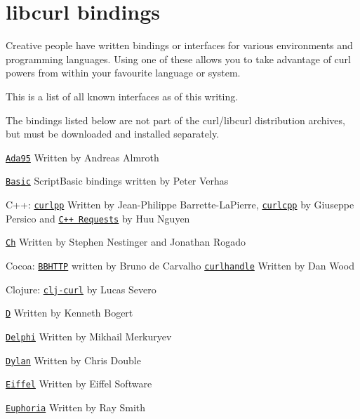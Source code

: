 \chapter{libcurl bindings }
\hypertarget{md_lib_2libwconr_2build_2__deps_2curl-src_2docs_2BINDINGS}{}\label{md_lib_2libwconr_2build_2__deps_2curl-src_2docs_2BINDINGS}
Creative people have written bindings or interfaces for various environments and programming languages. Using one of these allows you to take advantage of curl powers from within your favourite language or system.

This is a list of all known interfaces as of this writing.

The bindings listed below are not part of the curl/libcurl distribution archives, but must be downloaded and installed separately.

\href{https://web.archive.org/web/20070403105909/www.almroth.com/adacurl/index.html}{\texttt{Ada95}} Written by Andreas Almroth

\href{https://scriptbasic.com/}{\texttt{Basic}} Script\+Basic bindings written by Peter Verhas

C++\+: \href{https://github.com/jpbarrette/curlpp/}{\texttt{curlpp}} Written by Jean-\/\+Philippe Barrette-\/\+La\+Pierre, \href{https://github.com/JosephP91/curlcpp}{\texttt{curlcpp}} by Giuseppe Persico and \href{https://github.com/libcpr/cpr}{\texttt{C++ Requests}} by Huu Nguyen

\href{https://chcurl.sourceforge.net/}{\texttt{Ch}} Written by Stephen Nestinger and Jonathan Rogado

Cocoa\+: \href{https://github.com/biasedbit/BBHTTP}{\texttt{BBHTTP}} written by Bruno de Carvalho \href{https://github.com/karelia/curlhandle}{\texttt{curlhandle}} Written by Dan Wood

Clojure\+: \href{https://github.com/lsevero/clj-curl}{\texttt{clj-\/curl}} by Lucas Severo

\href{https://dlang.org/library/std/net/curl.html}{\texttt{D}} Written by Kenneth Bogert

\href{https://github.com/Mercury13/curl4delphi}{\texttt{Delphi}} Written by Mikhail Merkuryev

\href{https://dylanlibs.sourceforge.net/}{\texttt{Dylan}} Written by Chris Double

\href{https://iron.eiffel.com/repository/20.11/package/ABEF6975-37AC-45FD-9C67-52D10BA0669B}{\texttt{Eiffel}} Written by Eiffel Software

\href{https://web.archive.org/web/20050204080544/rays-web.com/eulibcurl.htm}{\texttt{Euphoria}} Written by Ray Smith

